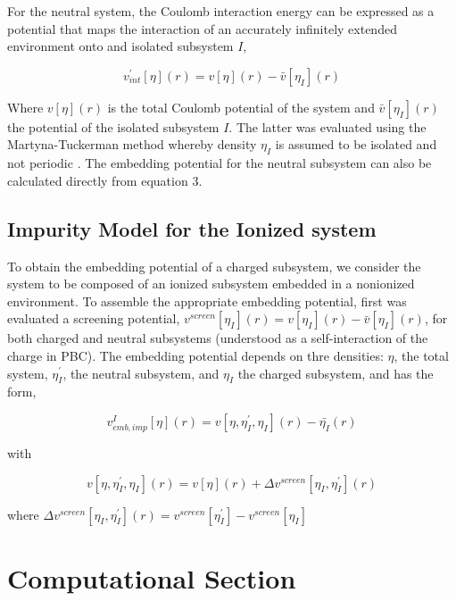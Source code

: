 \documentclass[12pt,a4paper]{article}
\begin{document}
For the neutral system, the Coulomb interaction energy can be expressed as a potential that maps the interaction of an accurately infinitely extended
environment onto and isolated subsystem $I$,

\begin{equation}
	v^{'}_{int} [\eta] (r) = v[\eta](r) - \bar{v} [\eta_I](r)
\end{equation}

Where $v[\eta](r)$ is the total Coulomb potential of the system and $\bar{v} [\eta_I](r)$ the potential of the isolated subsystem $I$. The latter was
evaluated using the Martyna-Tuckerman method whereby density $\eta_I$ is assumed to be isolated and not periodic \cite{martyna1999reciprocal}.
The embedding potential for the neutral subsystem can also be calculated directly from equation $3$.

\subsection{Impurity Model for the Ionized system}

To obtain the embedding potential of a charged subsystem, we consider the system to be composed of an ionized subsystem embedded in a nonionized
environment. To assemble the appropriate embedding potential, first was evaluated a screening potential,
$v^{screen}[\eta_I](r) = v[\eta_I](r) - \bar{v} [\eta_I](r)$, for both charged and neutral subsystems (understood as a self-interaction of the
charge in PBC). The embedding potential depends on thre densities: $\eta$, the total system, $\eta^{'}_I$, the neutral subsystem, and $\eta_I$ the
charged subsystem, and has the form,

\begin{equation}
	v^I_{emb,imp}[\eta](r) = v[\eta, \eta^{'}_I, \eta_I](r) - \bar{\eta_I}(r)
\end{equation}

with

\begin{equation}
	v[\eta, \eta^{'}_I, \eta_I](r) = v[\eta](r) + \Delta{v}^{screen}[\eta_I, \eta^{'}_I](r)
\end{equation}

where $\Delta{v}^{screen}[\eta_I, \eta^{'}_I](r) = {v}^{screen}[\eta^{'}_I] - {v}^{screen}[\eta_I]$

\section{Computational Section}
\end{document}
